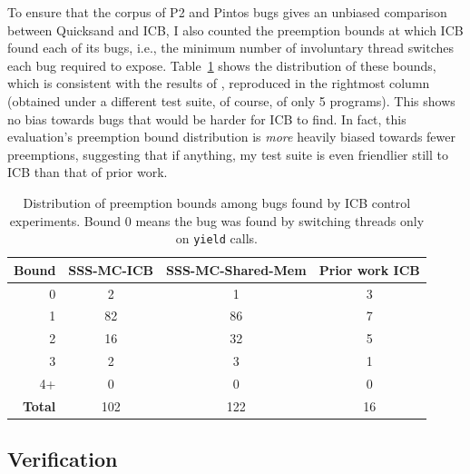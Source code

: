To ensure that the corpus of P2 and Pintos bugs gives an unbiased comparison between Quicksand and ICB,
I also counted the preemption bounds at which ICB found each of its bugs,
i.e., the minimum number of involuntary thread switches each bug required to expose.
Table~\ref{tab:icb-bounds} shows the distribution of these bounds,
which is consistent with the results of \cite[Table 2]{chess-icb},
reproduced in the rightmost column
(obtained under a different test suite, of course, of only 5 programs).
This shows no bias towards bugs that would be harder for ICB to find.
In fact, this evaluation's preemption bound distribution is {\em more} heavily biased towards fewer preemptions,
suggesting that if anything,
my test suite is even friendlier still to ICB than that of prior work.

\begin{table}[h]
	\begin{center}
		\small
	\begin{tabular}{r||c|c||c}
		{\bf Bound} & {\bf SSS-MC-ICB} & {\bf SSS-MC-Shared-Mem} & {\bf Prior work ICB} \cite{chess-icb} \\
		\hline
		0         & 2     & 1     & 3 \\
		1         & 82    & 86    & 7 \\
		2         & 16    & 32    & 5 \\
		3         & 2     & 3     & 1 \\
		4+        & 0     & 0     & 0 \\
		\hline
		\bf Total & 102   & 122   & 16 \\
	\end{tabular}
	\end{center}
	\caption[Distribution preemption bounds among bugs found by ICB.]
	{Distribution of preemption bounds among bugs found by ICB control experiments.
	Bound 0 means the bug was found by switching threads only on {\tt yield} calls.}
	\label{tab:icb-bounds}
\end{table}


\subsection{Verification}
\label{sec:quicksand-eval-verif}


